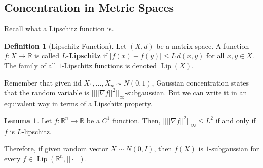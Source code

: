\documentclass{article}
\DeclareMathOperator{\Lip}{Lip}
\theoremstyle{definition}
\newtheorem{lemma}[theorem]{Lemma}
\theoremstyle{remark}
\theoremstyle{definition}
\newtheorem{definition}{Definition}[section]
\begin{document}
\subsection{Concentration in Metric Spaces}

Recall what a Lipschitz function is. 

\begin{definition}[Lipschitz Function]
Let $(X, d)$ be a matrix space. A function $f: X \rightarrow \mathbb{R}$ is called $L$-\textbf{Lipschitz} if $|f(x) - f(y)| \leq L \, d(x, y)$ for all $x, y \in X$. The family of all $1$-Lipschitz functions is denoted $\Lip(X)$. 
\end{definition}

Remember that given iid $X_1, \ldots, X_n \sim N(0, 1)$, Gaussian concentration states that the random variable is $|| ||\nabla f||^2 ||_\infty$-subgaussian. But we can write it in an equivalent way in terms of a Lipschitz property. 

\begin{lemma}
Let $f: \mathbb{R}^n \rightarrow \mathbb{R}$ be a $C^1$ function. Then, $|| ||\nabla f||^2 ||_\infty \leq L^2$ if and only if $f$ is $L$-lipschitz. 
\end{lemma}

Therefore, if given random vector $X \sim N(0, I)$, then $f(X)$ is $1$-subgaussian for every $f \in \Lip(\mathbb{R}^n, ||\cdot||)$. 
\end{document}
